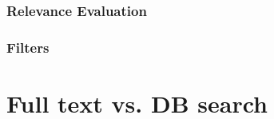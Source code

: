 \subsubsection*{Relevance Evaluation}

\subsubsection*{Filters}



%
%
%
%
%
%
%
%
%
%
%
%
%
%
%
%
%

\section{Full text vs. DB search}
\label{sec:fullVsDb}

